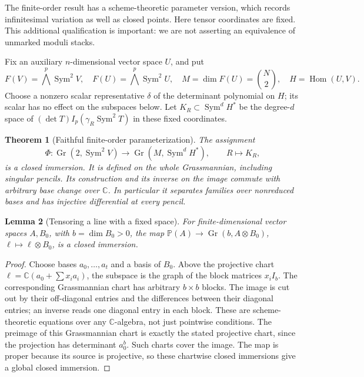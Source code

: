 \documentclass[11pt,reqno]{amsart}
\numberwithin{equation}{section}
\newtheorem{theorem}{Theorem}[section]
\newtheorem{lemma}[theorem]{Lemma}
\theoremstyle{definition}\newtheorem{definition}[theorem]{Definition}
\theoremstyle{remark}\newtheorem{remark}[theorem]{Remark}
\newcommand{\C}{\mathbb C}\newcommand{\Q}{\mathbb Q}
\newcommand{\Pj}{\mathbb P}\newcommand{\A}{\mathbb A}
\DeclareMathOperator{\Sym}{Sym}\DeclareMathOperator{\Gr}{Gr}
\DeclareMathOperator{\Hom}{Hom}\DeclareMathOperator{\Tot}{Tot}
\begin{document}
The finite-order result has a scheme-theoretic parameter version,
which records infinitesimal variation as well as closed points.
Here tensor coordinates are fixed.  This additional qualification
is important: we are not asserting an equivalence of unmarked
moduli stacks.

Fix an auxiliary \(n\)-dimensional vector space \(U\), and put
\[
 F(V)=\bigwedge^p\Sym^2V,\quad F(U)=\bigwedge^p\Sym^2U,
 \quad M=\dim F(U)=\binom N2,\quad H=\Hom(U,V).
\]
Choose a nonzero scalar representative \(\delta\) of the
determinant polynomial on \(H\); its scalar has no effect on
the subspaces below.  Let
\(K_R\subset\Sym^dH^*\) be the degree-\(d\) space of
\((\det T)I_p(\gamma_R\Sym^2T)\) in these fixed coordinates.

\begin{theorem}[Faithful finite-order parameterization]
\label{thm:finite-parameter-immersion}
The assignment
\begin{equation}\label{eq:finite-parameter-map}
 \Phi:\Gr(2,\Sym^2V)\longrightarrow\Gr(M,\Sym^dH^*),
       \qquad R\longmapsto K_R,
\end{equation}
is a closed immersion.  It is defined on the whole Grassmannian,
including singular pencils.  Its construction and its inverse on
the image commute with arbitrary base change over \(\C\).
In particular it separates families over nonreduced bases and has
injective differential at every pencil.
\end{theorem}

\begin{lemma}[Tensoring a line with a fixed space]
\label{lem:line-subspace-immersion}
For finite-dimensional vector spaces \(A,B_0\), with
\(b=\dim B_0>0\), the map
\(\Pj(A)\to\Gr(b,A\otimes B_0)\),
\(\ell\mapsto\ell\otimes B_0\), is a closed immersion.
\end{lemma}
\begin{proof}
Choose bases \(a_0,\ldots,a_t\) and a basis of \(B_0\).
Above the projective chart
\(\ell=\C(a_0+\sum x_i a_i)\), the subspace is the graph
of the block matrices \(x_i I_b\).  The corresponding
Grassmannian chart has arbitrary \(b\times b\) blocks.  The
image is cut out by their off-diagonal entries and the differences
between their diagonal entries; an inverse reads one diagonal
entry in each block.  These are scheme-theoretic equations over
any \(\C\)-algebra, not just pointwise conditions.  The
preimage of this Grassmannian chart is exactly the stated projective
chart, since the projection has determinant \(a_0^b\).
Such charts cover the image.  The map is proper because its source
is projective, so these chartwise closed immersions give a global
closed immersion.
\end{proof}
\end{document}

